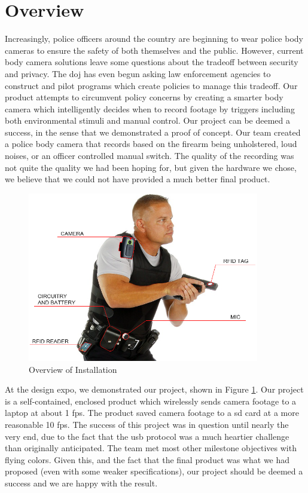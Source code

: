 \documentclass[12pt]{article}
\begin{document}
\section{Overview}
Increasingly, police officers around the country are beginning to wear police
body cameras to ensure the safety of both themselves and the public. However,
current body camera solutions leave some questions about the tradeoff between
security and privacy. The \gls{doj} has even begun asking law enforcement
agencies to construct and pilot programs which create policies to manage this
tradeoff\cite{officer_privacy}. Our product attempts to circumvent policy
concerns by creating a smarter body camera which intelligently decides when to
record footage by triggers including both environmental stimuli and manual
control.  Our project can be deemed a success, in the sense that we
demonstrated a proof of concept. Our team created a police body camera that
records based on the firearm being unholstered, loud noises, or an officer
controlled manual switch.  The quality of the recording was not quite the
quality we had been hoping for, but given the hardware we chose, we believe
that we could not have provided a much better final product. 

\begin{figure}[h]
    \centering
    \includegraphics[width=0.9\textwidth]{installation}
    \caption{Overview of Installation}
    \label{fig:installation}
\end{figure}

At the design expo, we demonstrated our project, shown in Figure
\ref{fig:installation}.  Our project is a self-contained, enclosed product
which wirelessly sends camera footage to a laptop at about 1 \gls{fps}. The
product saved camera footage to a \gls{sd} card at a more reasonable 10
\gls{fps}.  The success of this project was in question until nearly the very
end, due to the fact that the \gls{usb} protocol was a much heartier challenge
than originally anticipated. The team met most other milestone objectives with
flying colors. Given this, and the fact that the final product was what we had
proposed (even with some weaker specifications), our project should be deemed a
success and we are happy with the result.
\end{document}
